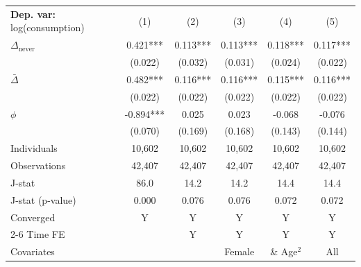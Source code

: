 \begin{tabular}{l ccccc} \toprule  \textbf{Dep. var:}  log(consumption) 
                    &\multicolumn{1}{c}{(1)}   &\multicolumn{1}{c}{(2)}   &\multicolumn{1}{c}{(3)}   &\multicolumn{1}{c}{(4)}   &\multicolumn{1}{c}{(5)}   \\

\addlinespace
$\Delta_{\text{never}}$&       0.421***&       0.113***&       0.113***&       0.118***&       0.117***\\
                    &     (0.022)   &     (0.032)   &     (0.031)   &     (0.024)   &     (0.022)   \\

\addlinespace
$\bar{\Delta}$      &       0.482***&       0.116***&       0.116***&       0.115***&       0.116***\\
                    &     (0.022)   &     (0.022)   &     (0.022)   &     (0.022)   &     (0.022)   \\

\addlinespace
$\phi$              &      -0.894***&       0.025   &       0.023   &      -0.068   &      -0.076   \\
                    &     (0.070)   &     (0.169)   &     (0.168)   &     (0.143)   &     (0.144)   \\
\addlinespace
Individuals         &      10,602   &      10,602   &      10,602   &      10,602   &      10,602   \\
Observations        &      42,407   &      42,407   &      42,407   &      42,407   &      42,407   \\
J-stat              &        86.0   &        14.2   &        14.2   &        14.4   &        14.4   \\
J-stat (p-value)    &       0.000   &       0.076   &       0.076   &       0.072   &       0.072   \\
Converged           &           Y   &           Y   &           Y   &           Y   &           Y   \\
\cmidrule{2-6} Time FE & & Y & Y & Y & Y \\ Covariates & & & Female & \& Age$^2$ & All \\ \bottomrule \end{tabular}
